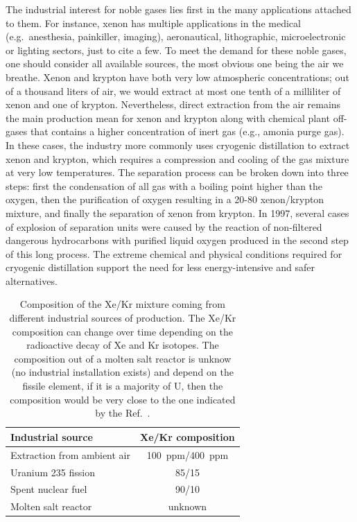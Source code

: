 \documentclass[main.tex]{subfiles}
\begin{document}
The industrial interest for noble gases lies first in the many applications attached to them. For instance, xenon has multiple applications in the medical (e.g.\ anesthesia, painkiller, imaging),\autocite{cullen1951anesthetic, holstrater2011intranasal,Mammarappallil_2019} aeronautical\autocite{Patterson_2002,Coxhill_2005}, lithographic\autocite{Abramov_2018}, microelectronic\autocite{Chang_1995} or lighting sectors,\autocite{Jarman_1974,Tanaka_2019} just to cite a few. To meet the demand for these noble gases, one should consider all available sources, the most obvious one being the air we breathe. Xenon and krypton have both very low atmospheric concentrations; out of a thousand liters of air, we would extract at most one tenth of a milliliter of xenon and one of krypton.\autocite{kerry2007industrial} Nevertheless, direct extraction from the air remains the main production mean for xenon and krypton along with chemical plant off-gases that contains a higher concentration of inert gas (e.g., amonia purge gas). In these cases, the industry more commonly uses cryogenic distillation to extract xenon and krypton, which requires a compression and cooling of the gas mixture at very low temperatures. The separation process can be broken down into three steps: first the condensation of all gas with a boiling point higher than the oxygen, then the purification of oxygen resulting in a 20-80 xenon/krypton mixture, and finally the separation of xenon from krypton. In 1997, several cases of explosion of separation units were caused by the reaction of non-filtered dangerous hydrocarbons with purified liquid oxygen produced in the second step of this long process.\autocite{distill_accident,distill_accident2} The extreme chemical and physical conditions required for cryogenic distillation support the need for less energy-intensive and safer alternatives. 

\begin{table}[ht]
\setlength{\extrarowheight}{1pt}
\centering
\begin{tabular}{|l|c|}
  \hline
  Industrial source  &  Xe/Kr composition  \\
  \hline
  Extraction from ambient air\autocite{kerry2007industrial} &  100~ppm/400~ppm  \\[0.5mm]
  Uranium 235 fission\autocite{Blades_1956} &  85/15 \\[0.5mm]
  Spent nuclear fuel\autocite{auerbach2003handbook} &  90/10  \\[0.5mm]
  Molten salt reactor\autocite{engel1971xenon,Riley_2019} &  unknown \\[0.5mm]
  \hline
\end{tabular}
\caption{Composition of the Xe/Kr mixture coming from different industrial sources of production. The Xe/Kr composition can change over time depending on the radioactive decay of Xe and Kr isotopes. The composition out of a molten salt reactor is unknow (no industrial installation exists) and depend on the fissile element, if it is a majority of U, then the composition would be very close to the one indicated by the Ref.~\cite{Blades_1956}. }
\label{tab:indus_app}
\end{table}
\end{document}

